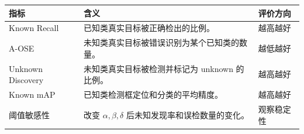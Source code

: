 \begin{tabular}{p{3.0cm}p{5.0cm}p{4.0cm}}
\toprule
指标 & 含义 & 评价方向 \\
\midrule
Known Recall & 已知类真实目标被正确检出的比例。 & 越高越好 \\
A-OSE & 未知类真实目标被错误识别为某个已知类的数量。 & 越低越好 \\
Unknown Discovery & 未知类真实目标被检测并标记为 unknown 的比例。 & 越高越好 \\
Known mAP & 已知类检测框定位和分类的平均精度。 & 越高越好 \\
阈值敏感性 & 改变 $\alpha,\beta,\delta$ 后未知发现率和误检数量的变化。 & 观察稳定性 \\
\bottomrule
\end{tabular}
